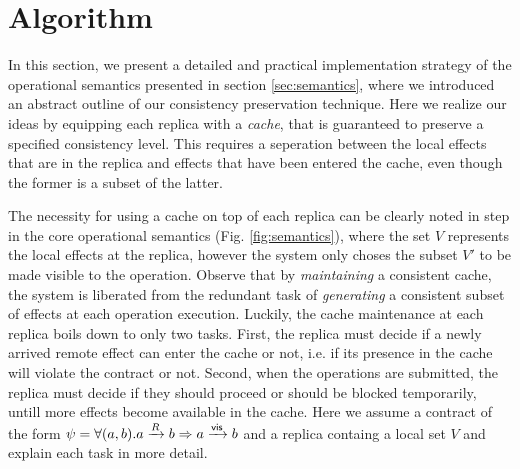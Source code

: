 \section{Algorithm}
%
In this section, we present a detailed and practical implementation
strategy of the operational semantics presented in section \ref{sec:semantics},
where we introduced an abstract outline of our consistency
preservation technique. Here we realize our ideas by equipping 
each replica with a \emph{cache}, that is guaranteed to
preserve a specified consistency level. This requires a seperation
between the local effects that are in the replica and effects that have
been entered the cache, even though the former is a subset of the latter. 

The necessity for using a cache on top of each replica  can be clearly noted 
in \visrule step in the core operational
semantics (Fig. \ref{fig:semantics}), where the set $V$
represents the local effects at the replica, however the system only
choses the subset $V'$ to be made visible to the operation. Observe
that by \emph{maintaining} a consistent cache, the system is liberated from the
redundant task of \emph{generating} a consistent subset of effects at each
operation execution.
Luckily, the cache maintenance at each replica boils down to only two
tasks. First, the
replica must decide if a newly arrived remote effect can enter the
cache or not, i.e. if its presence in the cache will violate the
contract or not.  Second, when the operations are submitted, the replica
must decide if they should proceed or should be blocked temporarily,
untill more effects become available in the cache.  Here we assume a
contract of the form  
$\psi = \forall (a,b). a \xrightarrow{R} b  \Rightarrow a
\xrightarrow{{\normalfont \textsf{vis}}} b$ and a replica containg a local set $V$ and explain each task in more detail.

